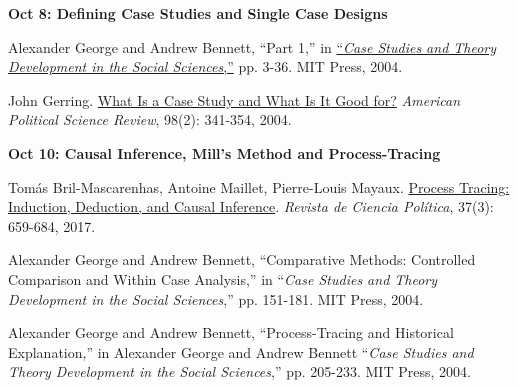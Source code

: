\documentclass[letterpaper]{article}
\renewenvironment{itemize}{
  \begin{list}{}{
    \setlength{\leftmargin}{1.5em}
  }
}{
  \end{list}
}
\begin{document}
\begin{enumerate}
		\begin{itemize}
		\item {\bf Oct 8: Defining Case Studies and Single Case Designs}
			\begin{itemize}
				\item[$\bullet$] Alexander George and Andrew Bennett, ``Part 1,'' in \href{https://pdfs.semanticscholar.org/94e9/eec015c650880356853533c4dc9b2dac42bb.pdf}{``\emph{Case Studies and Theory Development in the Social Sciences},''} pp. 3-36. MIT Press, 2004. %
				\item[$\bullet$] John Gerring. \href{https://www.cambridge.org/core/services/aop-cambridge-core/content/view/S0003055404001182}{What Is a Case Study and What Is It Good for?} \emph{American Political Science Review}, 98(2): 341-354, 2004. 
			\end{itemize}
		\end{itemize}



		\begin{itemize}
		\item {\bf Oct 10: Causal Inference, Mill's Method and Process-Tracing}
			\begin{itemize}
				\item[$\bullet$]  Tom\'as Bril-Mascarenhas, Antoine Maillet, Pierre-Louis Mayaux. \href{http://www.revistacienciapolitica.cl/index.php/rcp/article/view/354/73}{Process Tracing: Induction, Deduction, and Causal Inference}. \emph{Revista de Ciencia Pol\'itica}, 37(3): 659-684, 2017.
				\item[$\bullet$] Alexander George and Andrew Bennett, ``Comparative Methods: Controlled Comparison and Within Case Analysis,'' in ``\emph{Case Studies and Theory Development in the Social Sciences},'' pp. 151-181. MIT Press, 2004.%
				\item[$\bullet$] Alexander George and Andrew Bennett, ``Process-Tracing and Historical Explanation,'' in Alexander George and Andrew Bennett ``\emph{Case Studies and Theory Development in the Social Sciences},'' pp. 205-233. MIT Press, 2004.  %
			\end{itemize}
		\end{itemize}

~\\
\item[] \begin{center}{\color{blue}{\bf Monday Oct 15: National Holiday: No class.}}\end{center}
~\\



\end{enumerate}
\end{document}

